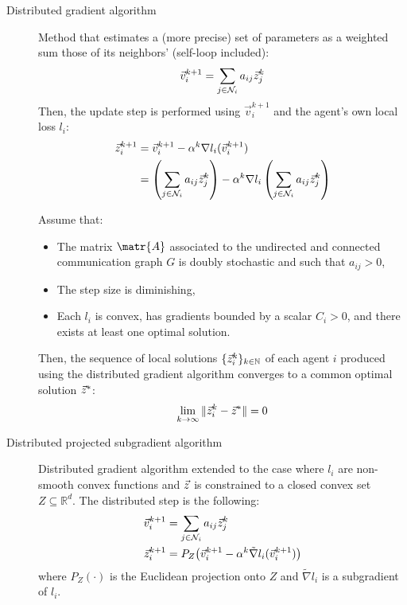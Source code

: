 \begin{description}
    \item[Distributed gradient algorithm] 
        Method that estimates a (more precise) set of parameters as a weighted sum those of its neighbors' (self-loop included):
        \[ 
            \vec{v}_i^{k+1} = \sum_{j \in \mathcal{N}_i} a_{ij} {\vec{z}}_j^k 
        \]
        Then, the update step is performed using $\vec{v}_i^{k+1}$ and the agent's own local loss $l_i$:
        \[
            \begin{split}
                {\vec{z}}_i^{k+1} &= \vec{v}_i^{k+1} - \alpha^k \nabla l_i(\vec{v}_i^{k+1}) \\
                &= \left(\sum_{j \in \mathcal{N}_i} a_{ij} {\vec{z}}_j^k\right) - \alpha^k \nabla l_i\left(\sum_{j \in \mathcal{N}_i} a_{ij} {\vec{z}}_j^k\right)
            \end{split}
        \]

        \begin{theorem} 
            Assume that:
            \begin{itemize}
                \item The matrix $\matr{A}$ associated to the undirected and connected communication graph $G$ is doubly stochastic and such that $a_{ij} > 0$,
                \item The step size is diminishing,
                \item Each $l_i$ is convex, has gradients bounded by a scalar $C_i > 0$, and there exists at least one optimal solution.
            \end{itemize}
            Then, the sequence of local solutions $\{ {\vec{z}}_i^k \}_{k \in \mathbb{N}}$ of each agent $i$ produced using the distributed gradient algorithm converges to a common optimal solution ${\vec{z}}^*$:
            \[ \lim_{k \rightarrow \infty} \Vert {\vec{z}}_i^k - {\vec{z}}^* \Vert = 0 \]
        \end{theorem}

    \item[Distributed projected subgradient algorithm] 
        Distributed gradient algorithm extended to the case where $l_i$ are non-smooth convex functions and ${\vec{z}}$ is constrained to a closed convex set $Z \subseteq \mathbb{R}^d$. The distributed step is the following:
        \[
            \begin{split}
                \vec{v}_i^{k+1} &= \sum_{j \in \mathcal{N}_i} a_{ij} {\vec{z}}_j^k \\
                {\vec{z}}_i^{k+1} &= P_Z \big( \vec{v}_i^{k+1} - \alpha^k \tilde{\nabla} l_i(\vec{v}_i^{k+1}) \big)
            \end{split}
        \]
        where $P_Z(\cdot)$ is the Euclidean projection onto $Z$ and $\tilde{\nabla} l_i$ is a subgradient of $l_i$.


\end{description}
